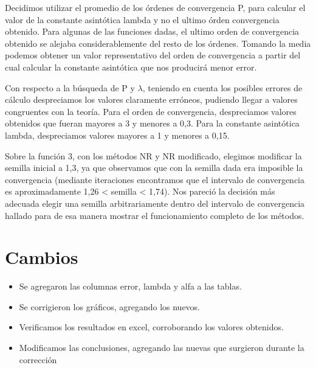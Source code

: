 \documentclass[titlepage,a4paper]{article}
\begin{document}
Decidimos utilizar el promedio de los órdenes de convergencia P, para calcular el valor de la constante asintótica lambda y no el ultimo órden convergencia obtenido. Para algunas de las funciones dadas, el ultimo orden de convergencia obtenido se alejaba considerablemente del resto de los órdenes. Tomando la media podemos obtener un valor representativo del orden de convergencia a partir del cual calcular la constante asintótica que nos producirá menor error.
 
Con respecto a la búsqueda de P y $\lambda$, teniendo en cuenta los posibles errores de cálculo despreciamos los valores claramente erróneos, pudiendo llegar a valores congruentes con la teoría. Para el orden de convergencia, despreciamos valores obtenidos que fueran mayores a 3 y menores a 0,3. Para la constante asintótica lambda, despreciamos valores mayores a 1 y menores a 0,15. 

Sobre la función 3, con los métodos NR y NR modificado, elegimos modificar la semilla inicial a 1,3, ya que observamos que con la semilla dada era imposible la convergencia (mediante iteraciones encontramos que el intervalo de convergencia es aproximadamente 1,26 < semilla < 1,74). Nos pareció la decisión más adecuada elegir una semilla arbitrariamente dentro del intervalo de convergencia hallado para de esa manera mostrar el funcionamiento completo de los métodos.

\section{Cambios}\label{sec:cambios}
    \begin{itemize}
	\item Se agregaron las columnas error, lambda y alfa a las tablas.
        \item Se corrigieron los gráficos, agregando los nuevos.
        \item Verificamos los resultados en excel, corroborando los valores obtenidos.
        \item Modificamos las conclusiones, agregando las nuevas que surgieron durante la corrección
    \end{itemize}
\end{document}
